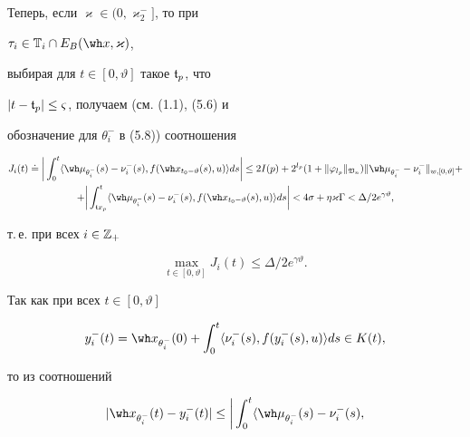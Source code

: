 \begin{pf}
Теперь, если $\varkappa\in(0,{\varkappa}_2^-]$, то при


$\tau_i\in\bT_i\cap E_B(\wh x,\varkappa)$,


выбирая для $t\in[0,\vartheta ]$ такое $\frak t_p$, что


$|t-\frak t_p|\le\varsigma$, получаем (см. (1.1), (5.6) и


обозначение для $\theta_i^-$ в (5.8)) соотношения


\begin{gather*}


J_i(t)\doteq\bigg|\int_0^t\langle


\wh\mu_{\theta_i^-}(s)-\nu_i^-(s),


f(\wh x_{t_0-\vartheta}(s),u)\rangle ds\bigg|\le2I(p)+


2^{l_p}(1+\|\varphi_{l_p}\|_{\frak V_n})


\|\wh\mu_{\theta_i^-}-\nu_i^-\|_{w,[0,\vartheta ]}+ \\ +


\bigg|\int_{\frak t x_p}^t\langle \wh


\mu_{\theta_i^-}(s)-\nu_i^-(s),f(\wh x_{t_0-\vartheta


}(s),u)\rangle ds\bigg|<


4\sigma+\eta\varkappa\Gamma<\Delta/2e^{\gamma\vartheta},


\end{gather*}


т.\,е. при всех $i\in\Bbb Z_+$


\begin{equation}


\max_{t\in[0,\vartheta]}J_i(t)\le\Delta/2e^{\gamma\vartheta}.


\end{equation}





Так как при всех $t\in[0,\vartheta]$


$$


y_i^-(t)=\wh x_{\theta_i^-}(0)+\int_0^t


\langle\nu_i^-(s),f(y_i^-(s),u)\rangle ds\in K(t),


$$


то из соотношений


\begin{gather*}


|\wh x_{\theta_i^-}(t)-y_i^-(t)|\le


\bigg|\int_0^t\langle\wh\mu_{\theta_i^-}(s)-\nu_i^-(s),



\end{gather*}
\end{pf}
